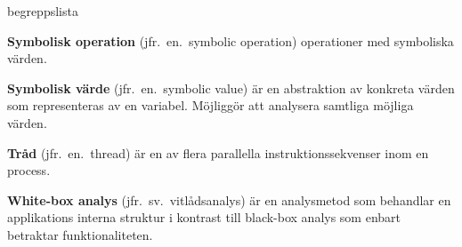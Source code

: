 \begin{labeling}{begreppslista}
    \item [\textbf{Symbolisk operation}] (jfr.\ en.\ symbolic
          operation) operationer med symboliska värden.

    \item [\textbf{Symbolisk värde}] (jfr.\ en.\ symbolic value) är en
    abstraktion av konkreta värden som representeras av en
    variabel. Möjliggör att analysera samtliga möjliga värden.

    \item [\textbf{Tråd}] (jfr.\ en.\ thread) är en av flera
    parallella instruktionssekvenser inom en process.

    \item [\textbf{White-box analys}] (jfr.\ sv.\ vitlådsanalys) är en
    analysmetod som behandlar en applikations interna struktur i
    kontrast till black-box analys som enbart betraktar
    funktionaliteten.

\end{labeling}
